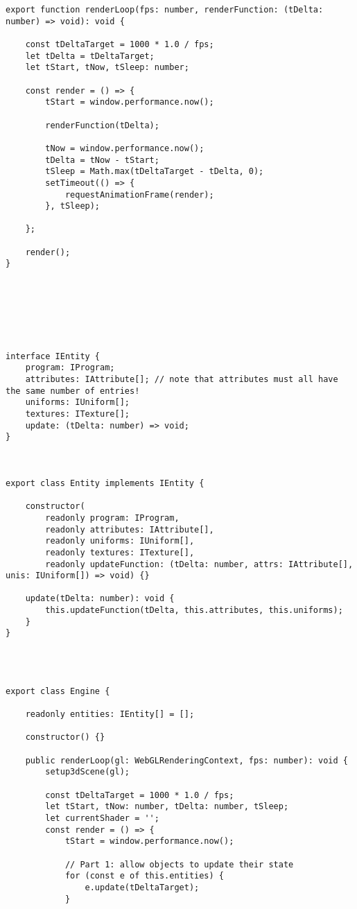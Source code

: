 \begin{lstlisting}
export function renderLoop(fps: number, renderFunction: (tDelta: number) => void): void {

    const tDeltaTarget = 1000 * 1.0 / fps;
    let tDelta = tDeltaTarget;
    let tStart, tNow, tSleep: number;

    const render = () => {
        tStart = window.performance.now();

        renderFunction(tDelta);

        tNow = window.performance.now();
        tDelta = tNow - tStart;
        tSleep = Math.max(tDeltaTarget - tDelta, 0);
        setTimeout(() => {
            requestAnimationFrame(render);
        }, tSleep);

    };

    render();
}







interface IEntity {
    program: IProgram;
    attributes: IAttribute[]; // note that attributes must all have the same number of entries!
    uniforms: IUniform[];
    textures: ITexture[];
    update: (tDelta: number) => void;
}



export class Entity implements IEntity {

    constructor(
        readonly program: IProgram,
        readonly attributes: IAttribute[],
        readonly uniforms: IUniform[],
        readonly textures: ITexture[],
        readonly updateFunction: (tDelta: number, attrs: IAttribute[], unis: IUniform[]) => void) {}

    update(tDelta: number): void {
        this.updateFunction(tDelta, this.attributes, this.uniforms);
    }
}




export class Engine {

    readonly entities: IEntity[] = [];

    constructor() {}

    public renderLoop(gl: WebGLRenderingContext, fps: number): void {
        setup3dScene(gl);

        const tDeltaTarget = 1000 * 1.0 / fps;
        let tStart, tNow: number, tDelta: number, tSleep;
        let currentShader = '';
        const render = () => {
            tStart = window.performance.now();

            // Part 1: allow objects to update their state
            for (const e of this.entities) {
                e.update(tDeltaTarget);
            }


\end{lstlisting}
